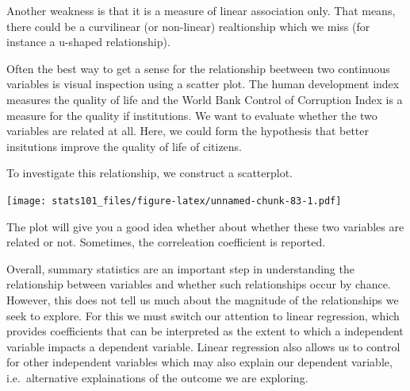 \documentclass[]{article}
\newenvironment{Shaded}{\begin{snugshade}}{\end{snugshade}}
\newcommand{\DataTypeTok}[1]{\textcolor[rgb]{0.13,0.29,0.53}{#1}}
\newcommand{\DecValTok}[1]{\textcolor[rgb]{0.00,0.00,0.81}{#1}}
\newcommand{\KeywordTok}[1]{\textcolor[rgb]{0.13,0.29,0.53}{\textbf{#1}}}
\newcommand{\NormalTok}[1]{#1}
\newcommand{\OperatorTok}[1]{\textcolor[rgb]{0.81,0.36,0.00}{\textbf{#1}}}
\newcommand{\OtherTok}[1]{\textcolor[rgb]{0.56,0.35,0.01}{#1}}
\newcommand{\StringTok}[1]{\textcolor[rgb]{0.31,0.60,0.02}{#1}}
\begin{document}
Another weakness is that it is a measure of linear association only. That means, there could be a curvilinear (or non-linear) realtionship which we miss (for instance a u-shaped relationship).

Often the best way to get a sense for the relationship beetween two continuous variables is visual inspection using a scatter plot. The human development index measures the quality of life and the World Bank Control of Corruption Index is a measure for the quality if institutions. We want to evaluate whether the two variables are related at all. Here, we could form the hypothesis that better insitutions improve the quality of life of citizens.

To investigate this relationship, we construct a scatterplot.

\begin{Shaded}
\end{Shaded}

\texttt{[image: stats101\_files/figure-latex/unnamed-chunk-83-1.pdf]}

The plot will give you a good idea whether about whether these two variables are related or not. Sometimes, the correleation coefficient is reported.

Overall, summary statistics are an important step in understanding the relationship between variables and whether such relationships occur by chance. However, this does not tell us much about the magnitude of the relationships we seek to explore. For this we must switch our attention to linear regression, which provides coefficients that can be interpreted as the extent to which a independent variable impacts a dependent variable. Linear regression also allows us to control for other independent variables which may also explain our dependent variable, i.e.~alternative explainations of the outcome we are exploring.
\end{document}

